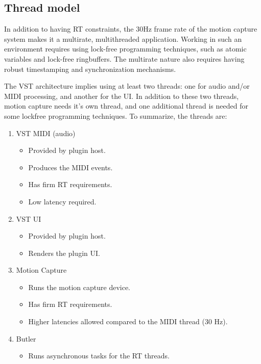 \subsection{Thread model}

In addition to having RT constraints,
the 30Hz frame rate of the motion capture system
makes it a multirate, multithreaded application.
Working in such an environment requires using
lock-free programming techniques,
such as atomic variables and lock-free ringbuffers.
The multirate nature also requires having robust timestamping and synchronization mechanisms.

The VST architecture implies using at least two threads:
one for audio and/or MIDI processing,
and another for the UI.
In addition to these two threads,
motion capture needs it's own thread,
and one additional thread is needed for some
lockfree programming techniques.
To summarize, the threads are:
\begin{enumerate}

\item VST MIDI (audio)
\begin{itemize}
\item Provided by plugin host.
\item Produces the MIDI events.
\item Has firm RT requirements.
\item Low latency required.
\end{itemize}

\item VST UI
\begin{itemize}
\item Provided by plugin host.
\item Renders the plugin UI.
\end{itemize}

\item Motion Capture
\begin{itemize}
\item Runs the motion capture device.
\item Has firm RT requirements.
\item Higher latencies allowed compared to the MIDI thread (30 Hz).
\end{itemize}

\item Butler
\begin{itemize}
\item Runs asynchronous tasks for the RT threads.
\end{itemize}

\end{enumerate}

